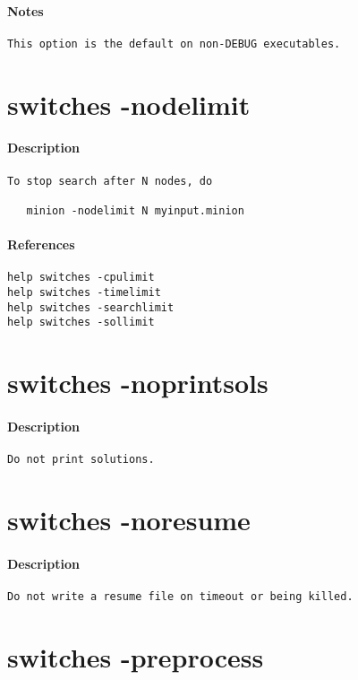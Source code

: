 \paragraph{Notes}
{\footnotesize
\begin{verbatim}
This option is the default on non-DEBUG executables.
\end{verbatim}
}
\section{switches -nodelimit}
\paragraph{Description}
{\footnotesize
\begin{verbatim}
To stop search after N nodes, do

   minion -nodelimit N myinput.minion
\end{verbatim}
}
\paragraph{References}
{\footnotesize
\begin{verbatim}
help switches -cpulimit
help switches -timelimit
help switches -searchlimit
help switches -sollimit
\end{verbatim}
}
\section{switches -noprintsols}
\paragraph{Description}
{\footnotesize
\begin{verbatim}
Do not print solutions.
\end{verbatim}
}
\section{switches -noresume}
\paragraph{Description}
{\footnotesize
\begin{verbatim}
Do not write a resume file on timeout or being killed.
\end{verbatim}
}
\section{switches -preprocess}

